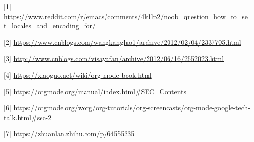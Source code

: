 \documentclass{ctexrep}
\begin{document}
[1] \url{https://www.reddit.com/r/emacs/comments/4k1lp2/noob\_question\_how\_to\_set\_locales\_and\_encoding\_for/}

[2] \url{https://www.cnblogs.com/wangkangluo1/archive/2012/02/04/2337705.html}

[3] \url{http://www.cnblogs.com/visayafan/archive/2012/06/16/2552023.html}

[4] \url{https://xiaoguo.net/wiki/org-mode-book.html}

[5] \url{https://orgmode.org/manual/index.html\#SEC\_Contents}

[6] \url{https://orgmode.org/worg/org-tutorials/org-screencasts/org-mode-google-tech-talk.html\#sec-2}

[7] \url{https://zhuanlan.zhihu.com/p/64555335}
\end{document}
